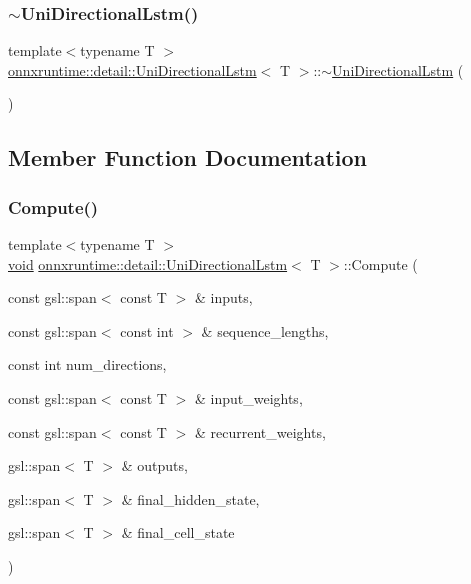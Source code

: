 \subsubsection{\texorpdfstring{$\sim$\+Uni\+Directional\+Lstm()}{~UniDirectionalLstm()}}
{\footnotesize\ttfamily template$<$typename T $>$ \\
\mbox{\hyperlink{classonnxruntime_1_1detail_1_1UniDirectionalLstm}{onnxruntime\+::detail\+::\+Uni\+Directional\+Lstm}}$<$ T $>$\+::$\sim$\mbox{\hyperlink{classonnxruntime_1_1detail_1_1UniDirectionalLstm}{Uni\+Directional\+Lstm}} (\begin{DoxyParamCaption}{ }\end{DoxyParamCaption})\hspace{0.3cm}{\ttfamily [default]}}



\subsection{Member Function Documentation}
\mbox{\label{classonnxruntime_1_1detail_1_1UniDirectionalLstm_a63b38c940bfa73e61b756af810677b5b}} 
\subsubsection{\texorpdfstring{Compute()}{Compute()}}
{\footnotesize\ttfamily template$<$typename T $>$ \\
\mbox{\hyperlink{mlasi_8h_a88f941d423cb2a819b70a1358982b1a6}{void}} \mbox{\hyperlink{classonnxruntime_1_1detail_1_1UniDirectionalLstm}{onnxruntime\+::detail\+::\+Uni\+Directional\+Lstm}}$<$ T $>$\+::Compute (\begin{DoxyParamCaption}\item[{const gsl\+::span$<$ const T $>$ \&}]{inputs,  }\item[{const gsl\+::span$<$ const int $>$ \&}]{sequence\+\_\+lengths,  }\item[{const int}]{num\+\_\+directions,  }\item[{const gsl\+::span$<$ const T $>$ \&}]{input\+\_\+weights,  }\item[{const gsl\+::span$<$ const T $>$ \&}]{recurrent\+\_\+weights,  }\item[{gsl\+::span$<$ T $>$ \&}]{outputs,  }\item[{gsl\+::span$<$ T $>$ \&}]{final\+\_\+hidden\+\_\+state,  }\item[{gsl\+::span$<$ T $>$ \&}]{final\+\_\+cell\+\_\+state }\end{DoxyParamCaption})}


